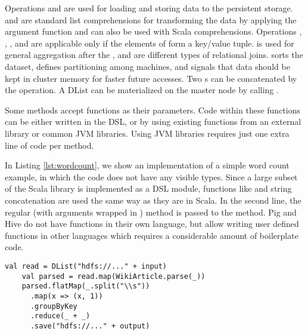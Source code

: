 Operations  and  are used for loading and storing data to the persistent storage.  and  are standard list comprehensions for transforming the data by applying the argument function and can also be used with Scala  comprehensions. Operations , , ,  and  are applicable only if the elements of  form a key/value tuple.  is used for general aggregation after the ,  and  are different types of relational joins.  sorts the dataset,  defines partitioning among machines, and  signals that data should be kept in cluster memory for faster future accesses. Two s can be concatenated by the \code{++} operation. A DList can be materialized on the master node by calling .

Some methods accept functions as their parameters. Code within these functions can be either written in the \tool DSL, or by using existing functions from an external library or common JVM libraries. Using JVM libraries requires just one extra line of code per method.  

In Listing \ref{lst:wordcount}, we show an implementation of a simple word count example, in which the code does not have any visible  types. Since a large subset of the Scala library is implemented as a DSL module, functions like  and string concatenation are used the same way as they are in Scala. In the second line, the regular (with arguments wrapped in ) method  is passed to the  method. Pig and Hive do not have functions in their own language, but allow writing user defined functions in other languages which requires a considerable amount of boilerplate code.

\begin{lstlisting}[name=code, caption=Example of word count program where type inference removes the need to declare any \scode{Rep} types., captionpos=b, label=lst:wordcount, float=t]
    val read = DList("hdfs://..." + input)
    val parsed = read.map(WikiArticle.parse(_))
    parsed.flatMap(_.split("\\s"))
      .map(x => (x, 1))
      .groupByKey
      .reduce(_ + _)
      .save("hdfs://..." + output)
\end{lstlisting}

